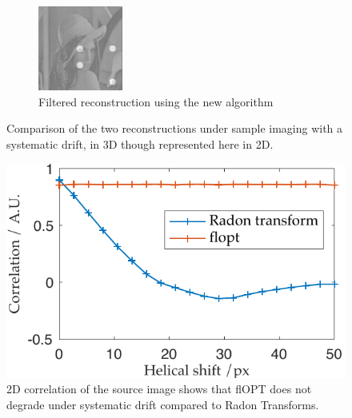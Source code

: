 \begin{figure}
\begin{subfigure}[t]{0.3\textwidth}
    \includegraphics[width=\textwidth]{Chapters/flopt/Figs/PDF/results/helix/filtered_recon_helix}
    \caption{Filtered reconstruction using the new algorithm}
    \label{fig:filtered_recon_helix}
  \end{subfigure}
    \hfill
    \label{fig:flopts}
  \caption{Comparison of the two reconstructions under sample imaging with a systematic drift, in 3D though represented here in 2D.}
\end{figure}
\begin{figure}
  \centering
  \includegraphics{Chapters/flopt/Figs/PDF/results/correlation_helicity}
  \caption{2D correlation of the source image shows that flOPT does not degrade under systematic drift compared to Radon Transforms.}
  \label{fig:helical_comparison}
\end{figure}


